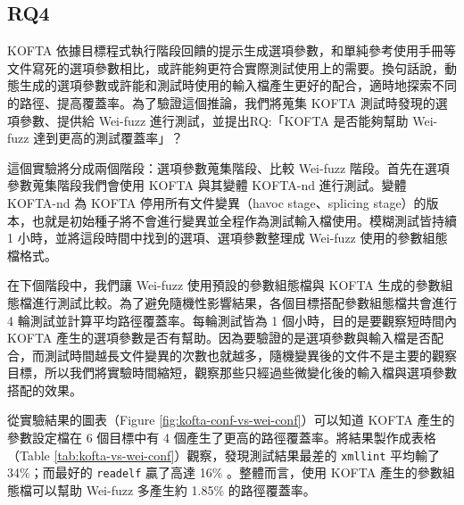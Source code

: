 

\subsection{RQ4}
\label{sec:rq-cov}

KOFTA 依據目標程式執行階段回饋的提示生成選項參數，和單純參考使用手冊等文件寫死的選項參數相比，或許能夠更符合實際測試使用上的需要。換句話說，動態生成的選項參數或許能和測試時使用的輸入檔產生更好的配合，適時地探索不同的路徑、提高覆蓋率。為了驗證這個推論，我們將蒐集 KOFTA 測試時發現的選項參數、提供給 Wei-fuzz 進行測試，並提出RQ:「KOFTA 是否能夠幫助 Wei-fuzz 達到更高的測試覆蓋率」？

這個實驗將分成兩個階段：選項參數蒐集階段、比較 Wei-fuzz 階段。首先在選項參數蒐集階段我們會使用 KOFTA 與其變體 KOFTA-nd 進行測試。變體 KOFTA-nd 為 KOFTA 停用所有文件變異（havoc stage、splicing stage）的版本，也就是初始種子將不會進行變異並全程作為測試輸入檔使用。模糊測試皆持續 1 小時，並將這段時間中找到的選項、選項參數整理成 Wei-fuzz 使用的參數組態檔格式。

在下個階段中，我們讓 Wei-fuzz 使用預設的參數組態檔與 KOFTA 生成的參數組態檔進行測試比較。為了避免隨機性影響結果，各個目標搭配參數組態檔共會進行 4 輪測試並計算平均路徑覆蓋率。每輪測試皆為 1 個小時，目的是要觀察短時間內 KOFTA 產生的選項參數是否有幫助。因為要驗證的是選項參數與輸入檔是否配合，而測試時間越長文件變異的次數也就越多，隨機變異後的文件不是主要的觀察目標，所以我們將實驗時間縮短，觀察那些只經過些微變化後的輸入檔與選項參數搭配的效果。

從實驗結果的圖表（Figure \ref{fig:kofta-conf-vs-wei-conf}）可以知道 KOFTA 產生的參數設定檔在 6 個目標中有 4 個產生了更高的路徑覆蓋率。將結果製作成表格（Table \ref{tab:kofta-vs-wei-conf}）觀察，發現測試結果最差的 \texttt{xmllint} 平均輸了 34\%；而最好的 \texttt{readelf} 贏了高達 16\% 。整體而言，使用 KOFTA 產生的參數組態檔可以幫助 Wei-fuzz 多產生約 1.85\% 的路徑覆蓋率。



